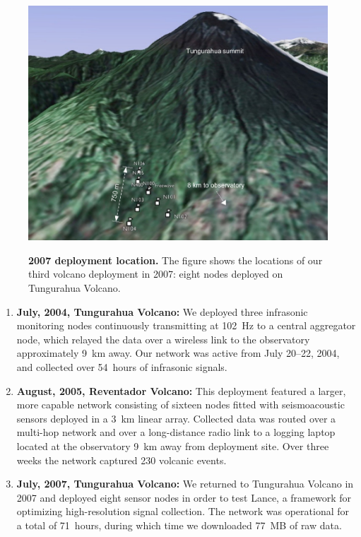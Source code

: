 \begin{figure}[t]
\begin{center}
\includegraphics[width=0.8\hsize]{./6-lance/figs/deploy/deployment-map.pdf}\\
\end{center}
\caption{\textbf{2007 deployment location.} The figure shows the locations of
our third volcano deployment in 2007: eight nodes deployed on Tungurahua
Volcano.}
\label{introduction-fig-deployment-map-2007}
\end{figure}

\begin{enumerate}

\item \textbf{July, 2004, Tungurahua Volcano:} We deployed three infrasonic
monitoring nodes continuously transmitting at 102~Hz to a central aggregator
node, which relayed the data over a wireless link to the observatory
approximately 9~km away.  Our network was active from July 20--22, 2004, and
collected over 54~hours of infrasonic signals.

\item \textbf{August, 2005, Reventador Volcano:} This deployment featured a larger,
more capable network consisting of sixteen nodes fitted with seismoacoustic
sensors deployed in a 3~km linear array.  Collected data was routed over a
multi-hop network and over a long-distance radio link to a logging laptop
located at the observatory 9~km away from deployment site.  Over three weeks
the network captured 230 volcanic events.

\item \textbf{July, 2007, Tungurahua Volcano:} We returned to Tungurahua Volcano in
2007 and deployed eight sensor nodes in order to test Lance, a framework for
optimizing high-resolution signal collection. The network was operational for
a total of 71~hours, during which time we downloaded 77~MB of raw data.

\end{enumerate}

